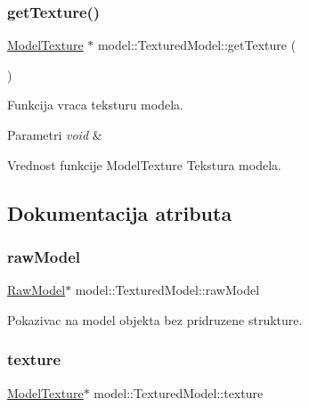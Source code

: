 \subsubsection{\texorpdfstring{get\+Texture()}{getTexture()}}
{\footnotesize\ttfamily \hyperlink{classtexture_1_1Texture}{Model\+Texture} $\ast$ model\+::\+Textured\+Model\+::get\+Texture (\begin{DoxyParamCaption}\item[{void}]{ }\end{DoxyParamCaption})}



Funkcija vraca teksturu modela. 


\begin{DoxyParams}{Parametri}
{\em void} & \\
\hline
\end{DoxyParams}
\begin{DoxyReturn}{Vrednost funkcije}
Model\+Texture Tekstura modela. 
\end{DoxyReturn}


\subsection{Dokumentacija atributa}
\mbox{\label{classmodel_1_1TexturedModel_ac6157368c7e55a78aa02f9546f5f2dc3}} 
\subsubsection{\texorpdfstring{raw\+Model}{rawModel}}
{\footnotesize\ttfamily \hyperlink{classmodel_1_1RawModel}{Raw\+Model}$\ast$ model\+::\+Textured\+Model\+::raw\+Model\hspace{0.3cm}{\ttfamily [private]}}



Pokazivac na model objekta bez pridruzene strukture. 

\mbox{\label{classmodel_1_1TexturedModel_aad9aacee1ff02e44bd8ee9daff22f817}} 
\subsubsection{\texorpdfstring{texture}{texture}}
{\footnotesize\ttfamily \hyperlink{classtexture_1_1Texture}{Model\+Texture}$\ast$ model\+::\+Textured\+Model\+::texture\hspace{0.3cm}{\ttfamily [private]}}



